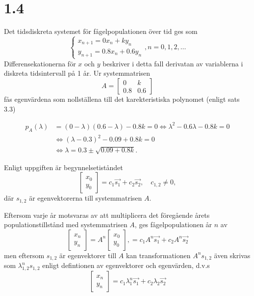 \documentclass[a4paper]{article}
\newcommand{\mat}[1]{\bm{\mathit{#1}}}
\begin{document}
\section*{1.4}

Det tidsdiskreta systemet för fågelpopulationen över tid ges som
\begin{equation*}
  \begin{cases}
    x_{n+1} = 0x_n + ky_n\\
    y_{n+1} = 0.8x_n + 0.6y_n
  \end{cases}, n = 0, 1, 2, \ldots
\end{equation*}
Differensekationerna för $x$ och $y$ beskriver i detta fall
derivatan av variablerna i diskreta tidsintervall på 1 år. Ur systemmatrisen
\begin{equation*}
  \mat{A} = \begin{bmatrix}0 & k \\ 0.8 & 0.6 \end{bmatrix}
\end{equation*}
fås egenvärdena som nollställena till det karekteristiska polynomet
(enligt sats 3.3)

\begin{align*}
  p_A(\lambda) &= (0-\lambda)(0.6 - \lambda) - 0.8k = 0 \iff \lambda^2 - 0.6\lambda - 0.8k = 0\\
               &\iff (\lambda - 0.3)^2 - 0.09 + 0.8k = 0\\
               &\iff \lambda = 0.3 \pm \sqrt{0.09 + 0.8k}.
\end{align*}

Enligt uppgiften är begynnelsetiståndet
\begin{equation*}
\begin{bmatrix}x_0\\y_0\end{bmatrix} = c_1\vec{s_1} + c_2\vec{s_2},\quad c_{1,2} \neq 0,
\end{equation*}
där $s_{1,2}$ är egenvektorerna till systemmatrisen $\mat{A}$.

Eftersom varje år motsvaras av att multiplicera det föregående årets populationstillstånd med systemmatrisen $\mat{A}$, ges fågelpopulationen år $n$ av
\begin{equation*}
\begin{bmatrix}x_n\\y_n\end{bmatrix} = \mat{A}^n\begin{bmatrix}x_0\\y_0\end{bmatrix}, = c_1\mat{A}^n\vec{s_1} + c_2\mat{A}^n\vec{s_2}
\end{equation*}
men eftersom $s_{1,2}$ är egenvektorer till $\mat{A}$ kan transformationen $\mat{A}^ns_{1,2}$ även skrivas som $\lambda_{1,2}^ns_{1,2}$ enligt defintionen av egenvektorer och egenvärden, d.v.s
\begin{equation}
\begin{bmatrix}x_n\\y_n\end{bmatrix} =  c_1\lambda_1^n\vec{s_1} + c_2\lambda_2\vec{s_2}\label{eq:14_key}
\end{equation}
\end{document}
